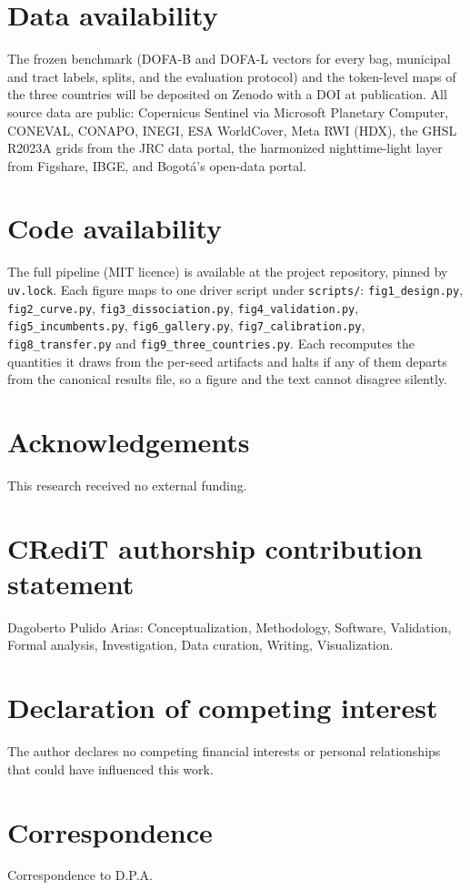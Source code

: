 \documentclass[11pt]{article}
\begin{document}
\section*{Data availability}
The frozen benchmark (DOFA-B and DOFA-L vectors for every bag, municipal and
tract labels, splits, and the evaluation protocol) and the token-level maps of the
three countries will be deposited on Zenodo with a DOI at publication. All source data are public: Copernicus Sentinel via Microsoft Planetary
Computer, CONEVAL, CONAPO, INEGI, ESA WorldCover, Meta RWI (HDX), the GHSL R2023A grids
from the JRC data portal, the harmonized nighttime-light layer from Figshare, IBGE, and
Bogot\'a's open-data portal.

\section*{Code availability}
The full pipeline (MIT licence) is available at the project repository, pinned by
\texttt{uv.lock}. Each figure maps to one driver script under \texttt{scripts/}:
\texttt{fig1\_design.py}, \texttt{fig2\_curve.py}, \texttt{fig3\_dissociation.py},
\texttt{fig4\_validation.py}, \texttt{fig5\_incumbents.py}, \texttt{fig6\_gallery.py},
\texttt{fig7\_calibration.py}, \texttt{fig8\_transfer.py} and
\texttt{fig9\_three\_countries.py}. Each recomputes the quantities it draws from
the per-seed artifacts and halts if any of them departs from the canonical results file,
so a figure and the text cannot disagree silently.

\section*{Acknowledgements}
This research received no external funding.

\section*{CRediT authorship contribution statement}
Dagoberto Pulido Arias: Conceptualization, Methodology, Software, Validation, Formal
analysis, Investigation, Data curation, Writing, Visualization.

\section*{Declaration of competing interest}
The author declares no competing financial interests or personal relationships that
could have influenced this work.

\section*{Correspondence}
Correspondence to D.P.A.

\clearpage
\end{document}
